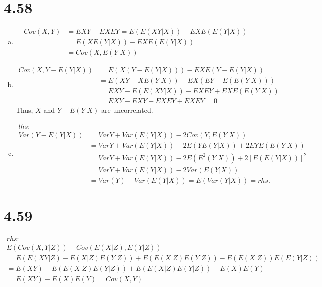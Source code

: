 \documentclass[letterpaper]{article}
\begin{document}
    \section*{4.58}
    \begin{enumerate}[(a)]
    \item
    \begin{eqnarray*}
    Cov(X, Y) & = EXY - EXEY = E\left(E(XY|X)\right) - EX E\left( E(Y|X) \right) \\
    & = E\left(XE(Y|X)\right) - EX E\left( E(Y|X) \right) \\
    & = Cov(X, E(Y|X)) 
    \end{eqnarray*}
    \item
    \begin{eqnarray*}
    Cov(X, Y-E(Y|X)) & = E\left(X(Y-E(Y|X))\right) - EXE(Y-E(Y|X)) \\
    & = E(XY-XE(Y|X)) - EX(EY-E(E(Y|X))) \\
    & = EXY - E(E(XY|X)) - EXEY + EXE(E(Y|X)) \\
    & = EXY - EXY - EXEY + EXEY = 0
    \end{eqnarray*}
    Thus, $X$ and $Y-E(Y|X)$ are uncorrelated.
    
    \item 
    \begin{align*}
    lhs: &\\
    Var(Y-E(Y|X)) &= VarY + Var(E(Y|X)) - 2Cov(Y, E(Y|X)) \\
    & = Var Y + Var(E(Y|X)) - 2E(YE(Y|X)) + 2EYE(E(Y|X)) \\
    & = Var Y + Var(E(Y|X)) - 2E(E^2(Y|X)) + 2\left[E(E(Y|X))\right]^2 \\
    & = Var Y + Var(E(Y|X)) - 2Var(E(Y|X)) \\
    & = Var(Y) - Var(E(Y|X)) = E(Var(Y|X)) = rhs.
    \end{align*}
    \end{enumerate}
    
    \section*{4.59}
    \begin{eqnarray*}
    rhs:  \\
    E(Cov(X,Y|Z)) + Cov(E(X|Z), E(Y|Z)) \\
     = E(E(XY|Z) - E(X|Z)E(Y|Z)) + E(E(X|Z)E(Y|Z)) - E(E(X|Z))E(E(Y|Z)) \\
    = E(XY) - E(E(X|Z)E(Y|Z)) + E(E(X|Z)E(Y|Z)) - E(X)E(Y) \\
    = E(XY) - E(X)E(Y) = Cov(X, Y)
    \end{eqnarray*}
\end{document}
